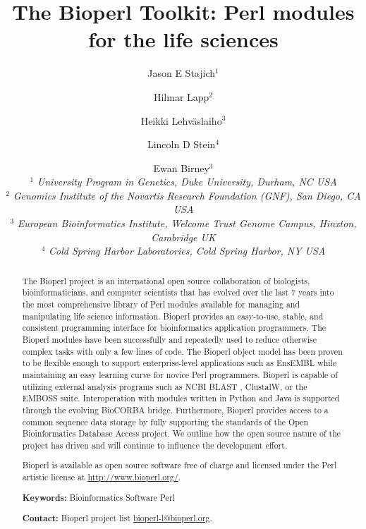 \documentclass[12pt]{article}
\begin{document}
\doublespacing

\title{The Bioperl Toolkit: Perl modules for the life sciences}
\author{Jason E Stajich$^1$ \and
Hilmar Lapp$^2$ \and
Heikki Lehv\"{a}slaiho$^3$ \and 
Lincoln D Stein$^4$ \and Ewan Birney$^3$ \\
$^1$ \small{\textit{University Program in Genetics, Duke University,  Durham, NC USA}} \\
$^2$ \small{\textit{Genomics Institute of the Novartis Research
Foundation (GNF), San Diego, CA USA}} \\
$^3$ \small{\textit{European Bioinformatics Institute, Welcome Trust
Genome Campus, Hinxton, Cambridge UK}} \\
$^4$ \small{\textit{Cold Spring Harbor Laboratories, Cold Spring Harbor, NY USA }}\\
}
\maketitle
\begin{abstract}

The Bioperl project is an international open source collaboration of
biologists, bioinformaticians, and computer scientists that has
evolved over the last 7 years into the most comprehensive library of
Perl modules available for managing and manipulating life science
information.  Bioperl provides an easy-to-use, stable, and consistent
programming interface for bioinformatics application programmers.  The
Bioperl modules have been successfully and repeatedly used to reduce
otherwise complex tasks with only a few lines of code.  The Bioperl
object model has been proven to be flexible enough to support
enterprise-level applications such as EnsEMBL while maintaining an
easy learning curve for novice Perl programmers.  Bioperl is capable
of utilizing external analysis programs such as NCBI BLAST , ClustalW,
or the EMBOSS suite.  Interoperation with modules written in Python
and Java is supported through the evolving BioCORBA bridge.
Furthermore, Bioperl provides access to a common sequence data storage
by fully supporting the standards of the Open Bioinformatics Database
Access project.  We outline how the open source nature of the project
has driven and will continue to influence the development effort.

Bioperl is available as open source software free of charge and
licensed under the Perl artistic license at \url{http://www.bioperl.org/}.

\textbf{Keywords:} Bioinformatics Software Perl

\textbf{Contact:} Bioperl project list \url{bioperl-l@bioperl.org}.

\end{abstract}
\end{document}
